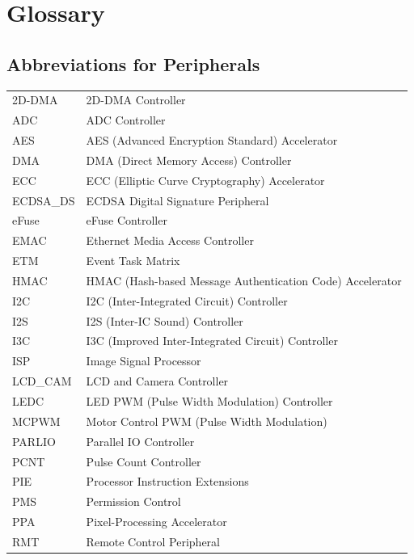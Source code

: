 \section*{Glossary}\label{glossary}
\rhead{\Navigation}

\subsection*{Abbreviations for Peripherals}

\begin{longtable}[c]{ R{3cm} p{12cm} }

2D-DMA & 2D-DMA Controller \\
ADC & ADC Controller \\
AES & AES (Advanced Encryption Standard) Accelerator \\
DMA & DMA (Direct Memory Access) Controller \\
ECC & ECC (Elliptic Curve Cryptography) Accelerator  \\
ECDSA\_DS & ECDSA Digital Signature Peripheral  \\
eFuse & eFuse Controller \\
EMAC & Ethernet Media Access Controller \\
ETM & Event Task Matrix \\
HMAC & HMAC (Hash-based Message Authentication Code) Accelerator \\
I2C & I2C (Inter-Integrated Circuit) Controller \\
I2S & I2S (Inter-IC Sound) Controller \\
I3C & I3C (Improved Inter-Integrated Circuit) Controller \\
ISP & Image Signal Processor \\
LCD\_CAM & LCD and Camera Controller \\
LEDC & LED PWM (Pulse Width Modulation) Controller \\
MCPWM & Motor Control PWM (Pulse Width Modulation) \\
PARLIO & Parallel IO Controller \\
PCNT & Pulse Count Controller \\
PIE & Processor Instruction Extensions \\
PMS & Permission Control \\
PPA & Pixel-Processing Accelerator \\
RMT & Remote Control Peripheral \\

\end{longtable}
